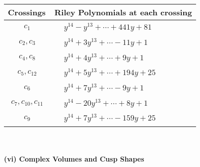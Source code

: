 \documentclass[1p]{elsarticle_modified}
\theoremstyle{definition}
\begin{document}
\begin{tabular}{m{50pt}|m{274pt}}
Crossings & \hspace{64pt}Riley Polynomials at each crossing \\
\hline $$\begin{aligned}c_{1}\end{aligned}$$&$\begin{aligned}
&y^{14}- y^{13}+\cdots+441 y+81
\end{aligned}$\\
\hline $$\begin{aligned}c_{2},c_{3}\end{aligned}$$&$\begin{aligned}
&y^{14}+3 y^{13}+\cdots-11 y+1
\end{aligned}$\\
\hline $$\begin{aligned}c_{4},c_{8}\end{aligned}$$&$\begin{aligned}
&y^{14}+4 y^{13}+\cdots+9 y+1
\end{aligned}$\\
\hline $$\begin{aligned}c_{5},c_{12}\end{aligned}$$&$\begin{aligned}
&y^{14}+5 y^{13}+\cdots+194 y+25
\end{aligned}$\\
\hline $$\begin{aligned}c_{6}\end{aligned}$$&$\begin{aligned}
&y^{14}+7 y^{13}+\cdots-9 y+1
\end{aligned}$\\
\hline $$\begin{aligned}c_{7},c_{10},c_{11}\end{aligned}$$&$\begin{aligned}
&y^{14}-20 y^{13}+\cdots+8 y+1
\end{aligned}$\\
\hline $$\begin{aligned}c_{9}\end{aligned}$$&$\begin{aligned}
&y^{14}+7 y^{13}+\cdots-159 y+25
\end{aligned}$\\
\hline
\end{tabular}\\~\\
\newpage\flushleft \textbf{(vi) Complex Volumes and Cusp Shapes}
\end{document}
